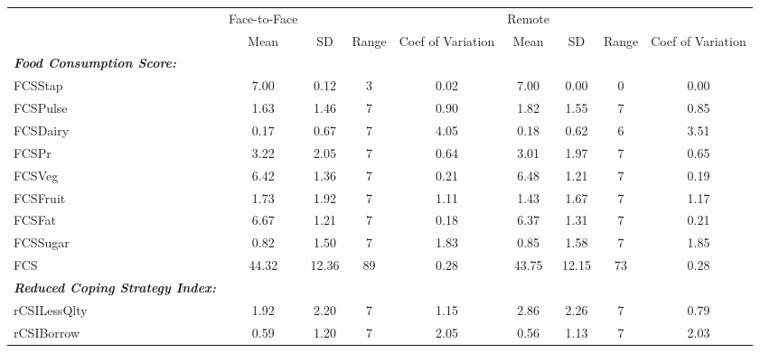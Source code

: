 {
\def\sym#1{\ifmmode^{#1}\else\(^{#1}\)\fi}
\begin{tabular}{l*{2}{cccc}}
\hline\hline
            &Face-to-Face&            &            &            &      Remote&            &            &            \\
            &        Mean&          SD&       Range&Coef of Variation&        Mean&          SD&       Range&Coef of Variation\\
\hline
      \textbf{\textit{Food Consumption Score:}}&            &            &            &            &            &            &            &            \\
FCSStap     &        7.00&        0.12&           3&        0.02&        7.00&        0.00&           0&        0.00\\
FCSPulse    &        1.63&        1.46&           7&        0.90&        1.82&        1.55&           7&        0.85\\
FCSDairy    &        0.17&        0.67&           7&        4.05&        0.18&        0.62&           6&        3.51\\
FCSPr       &        3.22&        2.05&           7&        0.64&        3.01&        1.97&           7&        0.65\\
FCSVeg      &        6.42&        1.36&           7&        0.21&        6.48&        1.21&           7&        0.19\\
FCSFruit    &        1.73&        1.92&           7&        1.11&        1.43&        1.67&           7&        1.17\\
FCSFat      &        6.67&        1.21&           7&        0.18&        6.37&        1.31&           7&        0.21\\
FCSSugar    &        0.82&        1.50&           7&        1.83&        0.85&        1.58&           7&        1.85\\
FCS         &       44.32&       12.36&          89&        0.28&       43.75&       12.15&          73&        0.28\\
      \textbf{\textit{Reduced Coping Strategy Index:}}&            &            &            &            &            &            &            &            \\
rCSILessQlty&        1.92&        2.20&           7&        1.15&        2.86&        2.26&           7&        0.79\\
rCSIBorrow  &        0.59&        1.20&           7&        2.05&        0.56&        1.13&           7&        2.03\\

\end{tabular}}
